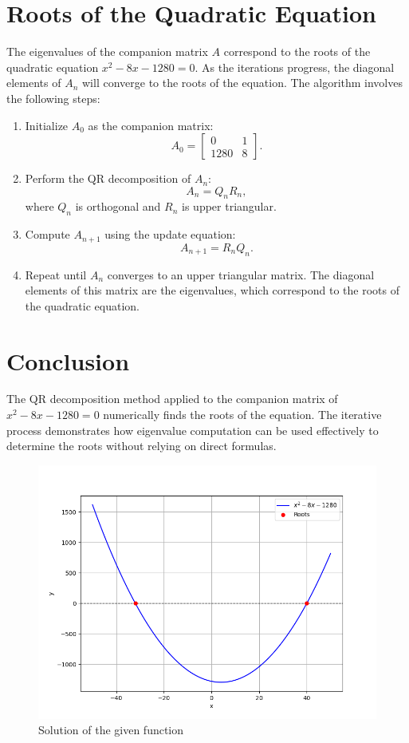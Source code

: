 \documentclass[journal]{IEEEtran}
\begin{document}
\section*{Roots of the Quadratic Equation}
The eigenvalues of the companion matrix \( A \) correspond to the roots of the quadratic equation \( x^2 - 8x - 1280 = 0 \). As the iterations progress, the diagonal elements of \( A_n \) will converge to the roots of the equation. The algorithm involves the following steps:
\begin{enumerate}
    \item Initialize \( A_0 \) as the companion matrix:
    \[
    A_0 = \begin{bmatrix}
    0 & 1 \\
    1280 & 8
    \end{bmatrix}.
    \]
    \item Perform the QR decomposition of \( A_n \):
    \[
    A_n = Q_n R_n,
    \]
    where \( Q_n \) is orthogonal and \( R_n \) is upper triangular.
    \item Compute \( A_{n+1} \) using the update equation:
    \[
    A_{n+1} = R_n Q_n.
    \]
    \item Repeat until \( A_n \) converges to an upper triangular matrix. The diagonal elements of this matrix are the eigenvalues, which correspond to the roots of the quadratic equation.
\end{enumerate}

\section*{Conclusion}
The QR decomposition method applied to the companion matrix of \( x^2 - 8x - 1280 = 0 \) numerically finds the roots of the equation. The iterative process demonstrates how eigenvalue computation can be used effectively to determine the roots without relying on direct formulas.


\begin{figure}[!ht]
		\centering
		\includegraphics[width=\columnwidth]{figs/Figure_2.png}
		\caption{Solution of the given function}
		\label{stemplot}
	\end{figure}
\end{document}
